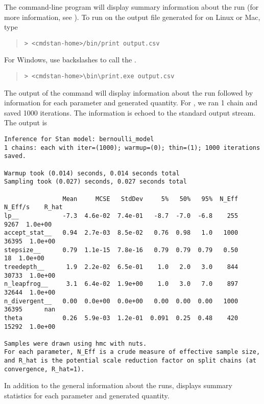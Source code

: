 The command-line program  will display summary
information about the run (for more information, see
). To run  on the output file
generated for  on Linux or Mac, type
%
\begin{quote}
\begin{Verbatim}[fontshape=sl]
> <cmdstan-home>/bin/print output.csv
\end{Verbatim}
\end{quote}
%
For Windows, use backslashes to call the .
%
\begin{quote}
\begin{Verbatim}[fontshape=sl]
> <cmdstan-home>\bin\print.exe output.csv
\end{Verbatim}
\end{quote}
%
The output of the command will display information about the run
followed by information for each parameter and generated quantity. For
, we ran 1 chain and saved 1000 iterations. The
information is echoed to the standard output stream. The output is
%
\begin{Verbatim}[fontsize=\footnotesize]
Inference for Stan model: bernoulli_model
1 chains: each with iter=(1000); warmup=(0); thin=(1); 1000 iterations saved.

Warmup took (0.014) seconds, 0.014 seconds total
Sampling took (0.027) seconds, 0.027 seconds total

                Mean     MCSE   StdDev     5%   50%   95%  N_Eff  N_Eff/s    R_hat
lp__            -7.3  4.6e-02  7.4e-01   -8.7  -7.0  -6.8    255     9267  1.0e+00
accept_stat__   0.94  2.7e-03  8.5e-02   0.76  0.98   1.0   1000    36395  1.0e+00
stepsize__      0.79  1.1e-15  7.8e-16   0.79  0.79  0.79   0.50       18  1.0e+00
treedepth__      1.9  2.2e-02  6.5e-01    1.0   2.0   3.0    844    30733  1.0e+00
n_leapfrog__     3.1  6.4e-02  1.9e+00    1.0   3.0   7.0    897    32644  1.0e+00
n_divergent__   0.00  0.0e+00  0.0e+00   0.00  0.00  0.00   1000    36395      nan
theta           0.26  5.9e-03  1.2e-01  0.091  0.25  0.48    420    15292  1.0e+00

Samples were drawn using hmc with nuts.
For each parameter, N_Eff is a crude measure of effective sample size,
and R_hat is the potential scale reduction factor on split chains (at
convergence, R_hat=1).
\end{Verbatim}
%
In addition to the general information about the runs, 
displays summary statistics for each parameter and generated
quantity.

